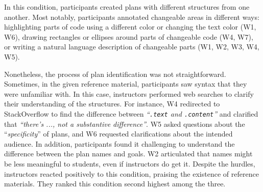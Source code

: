 In this condition, participants created plans with different structures from one another.
Most notably, participants annotated changeable areas in different ways: highlighting parts of code using a different color or changing the text color (W1, W6), drawing rectangles or ellipses around parts of changeable code (W4, W7), or writing a natural language description of changeable parts (W1, W2, W3, W4, W5).

Nonetheless, the process of plan identification was not straightforward. Sometimes, in the given reference material, participants saw syntax that they were unfamiliar with. In this case, instructors performed web searches to clarify their understanding of the structures. For instance, W4 redirected to StackOverflow to find the difference between \textit{``\texttt{.text} and \texttt{.content}''} and clarified that \textit{``there's ..., not a substantive difference''}. W5 asked questions about the ``\textit{specificity}'' of plans, and W6 requested clarifications about the intended audience. In addition, participants found it challenging to understand the difference between the plan names and goals. W2 articulated that names might be less meaningful to students, even if instructors do get it.
Despite the hurdles, instructors reacted positively to 
this condition, praising the existence of reference materials. They ranked this condition second highest among the three.

